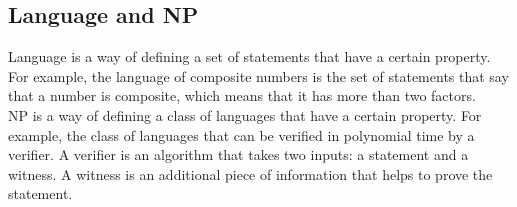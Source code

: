 \documentclass{report}
\begin{document}
\subsection{Language and NP}
Language is a way of defining a set of statements that have a certain property. For example, the language of composite numbers is the set of statements that say that a number is composite, which means that it has more than two factors.\\
NP is a way of defining a class of languages that have a certain property. For example, the class of languages that can be verified in polynomial time by a verifier. A verifier is an algorithm that takes two inputs: a statement and a witness. A witness is an additional piece of information that helps to prove the statement.
\end{document}
